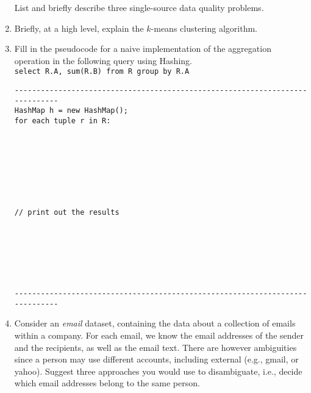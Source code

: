 \documentclass[11pt]{article}
\newcommand{\answer}[2]{\noindent {\bf Answer:} #2}
\renewcommand{\answer}[2]{\vspace{#1}}
\begin{document}
\begin{enumerate}
\answer{2.7in}

\item List and briefly describe three single-source data quality problems.

\answer{2.7in}{ }


\item Briefly, at a high level, explain the $k$-means clustering algorithm.

\answer{3in}{}



\newpage
\item Fill in the pseudocode for a naive implementation of the aggregation operation in the following query using Hashing.  \\[2pt]
{\tt select R.A, sum(R.B) from R group by R.A}

\begin{verbatim}
-----------------------------------------------------------------------------
HashMap h = new HashMap();
for each tuple r in R:
    







// print out the results







-----------------------------------------------------------------------------
\end{verbatim}

\item Consider an {\em email} dataset, containing the data about a collection of emails within a company. For each email, we know the email
addresses of the sender and the recipients, as well as the email text. There are however ambiguities since a person may
use different accounts, including external (e.g., gmail, or yahoo). Suggest three approaches you would use to disambiguate, i.e., decide which email
addresses belong to the same person. 

\answer{3.5in}{}




\end{enumerate}
\end{document}
